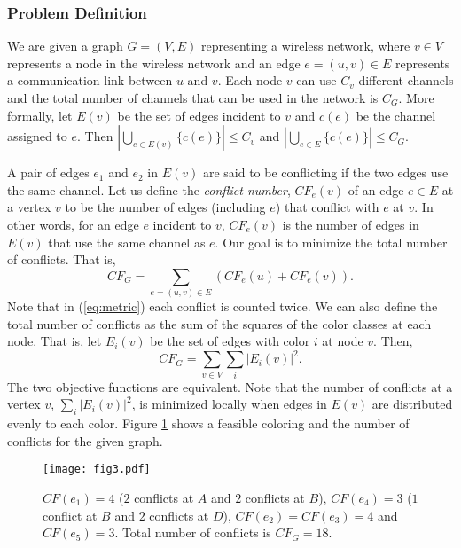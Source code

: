 \documentclass[titlepage, 11pt]{article}
\begin{document}
\subsubsection{Problem Definition}
We are given a graph $G=(V, E)$ representing a wireless network, where $v \in V$ represents a node in the wireless network and an edge $e = (u, v) \in E$ represents a communication link
between $u$ and $v$.
Each node $v$ can use $C_v$ different channels and the total number
of channels that can be used in the network is $C_G$. 
More formally, let $E(v)$ be the set of edges incident to $v$ and $c(e)$ be the channel assigned to $e$. 
Then $|\bigcup_{e \in E(v)} \{c(e)\}| \le C_v$ and 
$|\bigcup_{e \in E} \{c(e)\}| \le C_G$.
\iffalse when we color edges, we can use at most $C_G$ colors and for each node $v$,
edges in $E(v)$ can use at most $C_v$ different colors
(We use {\em channel} and {\em color} interchangeably).
\fi

A pair of edges $e_1$ and $e_2$ in $E(v)$ are said to be conflicting
if the two edges use the same channel.
Let us define the {\em conflict number}, $CF_e (v)$ of an edge 
$e \in E$ at a vertex $v$ to be the number of edges (including $e$) that conflict with $e$ at $v$.
In other words, for an edge $e$ incident to $v$,
$CF_e (v)$ is the number of edges in $E(v)$  that use the same channel as $e$. 
Our goal is to minimize the total number of conflicts. That is, 
\begin{equation} \label{eq:metric} 
CF_G =  \sum_{e = (u, v)\in E}(CF_e (u) + CF_e (v)) . 
\end{equation}
Note that in (\ref{eq:metric}) each conflict is counted twice. We can also define the total number of conflicts as the sum of the squares of the color classes at each node.
That is, let $E_i(v)$ be the set of  edges with color $i$ at node $v$. Then,  
\begin{equation} \label{eq:otherdef} 
CF_G = \sum_{v\in V}\sum_i{|E_i(v)|^2} .
\end{equation}
The two objective functions are equivalent.
Note that the number of conflicts at a vertex $v$, $\sum_i{|E_i(v)|^2}$, 
is minimized locally when edges in $E(v)$ are distributed evenly to each color.
Figure \ref{fig:cfexample} shows a feasible coloring and  the number of conflicts for the given graph.
\begin{figure}[ht]
\begin{center}
    \centerline{\texttt{[image: fig3.pdf]}}
    \caption{
$CF(e_1) = 4$ ($2$ conflicts at $A$ and $2$ conflicts at $B$), $CF(e_4) = 3$ ($1$ conflict at $B$ and $2$ conflicts at $D$), $CF(e_2) = CF(e_3) = 4$ and $CF(e_5)=3$.
\newline
Total number of conflicts is $CF_G=18$.
\label{fig:cfexample}}
\end{center}   
\end{figure} 
\end{document}
